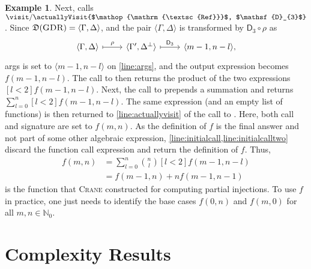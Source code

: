 \documentclass{article}
\theoremstyle{definition}
\newtheorem{example}{Example}
\theoremstyle{remark}
\newcommand{\Done}{\mathsf{D}_{1}}
\newcommand{\Dthree}{\mathsf{D}_{3}}
\DeclareMathOperator{\GDR}{\textsc{GDR}}
\DeclareMathOperator{\Reff}{\textsc{Ref}}
\begin{document}
\begin{example}
  Next, \actuallyVisit{$\land$, $\Dthree$} calls
  $\visit/\actuallyVisit{$\Reff$, $\Dthree$}$. Since
  $\mathfrak{D}(\GDR) = \langle \Gamma, \Delta \rangle$, and the pair
  $\langle\Gamma, \Delta\rangle$ is transformed by $\Dthree{} \circ \rho$ as
  \[
    \begin{tikzcd}
      \langle\Gamma, \Delta\rangle \ar[r, mapsto, "\rho"] & \langle\Gamma', \Delta^{\bot}\rangle \ar[r, mapsto, "\Dthree"] & \langle m-1, n-l \rangle,
    \end{tikzcd}
  \]
  \textsf{args} is set to $\langle m-1, n-l \rangle$ on \cref{line:args}, and
  the output expression becomes $f(m-1, n-l)$. The call to
  \actuallyVisit{$\land$, $\Dthree$} then returns the product of the two
  expressions $[l<2]f(m-1, n-l)$. Next, the call to \actuallyVisit{$\bigvee$,
    $\Done$} prepends a summation and returns $\sum_{l=0}^{n}[l<2]f(m-1,n-l)$.
  The same expression (and an empty list of functions) is then returned to
  \cref{line:actuallyvisit} of the call to \visit{$\GDR$, $\Done$}. Here, both
  \textsf{call} and \textsf{signature} are set to $f(m, n)$. As the definition
  of $f$ is the final answer and not part of some other algebraic expression,
  \cref{line:initialcall,line:initialcalltwo} discard the function call
  expression and return the definition of $f$. Thus,
  \begin{align}
    f(m, n) &= \sum_{l = 0}^{n} \binom{n}{l} [l < 2] f(m-1, n-l)\nonumber \\
            &= f(m-1, n) + n f(m-1, n-1)\label{eq:solution}
  \end{align}
  is the function that \textsc{Crane} constructed for computing partial
  injections. To use $f$ in practice, one just needs to identify the base cases
  $f(0, n)$ and $f(m, 0)$ for all $m, n \in \mathbb{N}_{0}$.
\end{example}

\section{Complexity Results}\label{sec:results}



\end{document}
